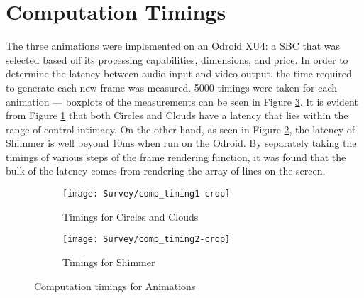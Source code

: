 \documentclass[../initial_thesis.tex]{subfiles}
\begin{document}
\section{Computation Timings} \label{sec:timings}
The three animations were implemented on an Odroid XU4: a SBC that was selected based off its processing capabilities, dimensions, and price. In order to determine the latency between audio input and video output, the time required to generate each new frame was measured. 5000 timings were taken for each animation --- boxplots of the measurements can be seen in Figure \ref{fig:comp_timings}. It is evident from Figure \ref{fig:timings_circlesclouds} that both Circles and Clouds have a latency that lies within the range of control intimacy. On the other hand, as seen in Figure \ref{fig:timings_shimmer}, the latency of Shimmer is well beyond 10ms when run on the Odroid. By separately taking the timings of various steps of the frame rendering function, it was found that the bulk of the latency comes from rendering the array of lines on the screen.

\begin{figure}
  \begin{subfigure}{0.5\textwidth}
    \centering
    \texttt{[image: Survey/comp\_timing1-crop]}
    \caption{Timings for Circles and Clouds}
    \label{fig:timings_circlesclouds}
  \end{subfigure}
  \begin{subfigure}{0.5\textwidth}
    \centering
    \texttt{[image: Survey/comp\_timing2-crop]}
    \caption{Timings for Shimmer}
    \label{fig:timings_shimmer}
  \end{subfigure}
  \caption{Computation timings for Animations}
  \label{fig:comp_timings}
\end{figure}
\end{document}
